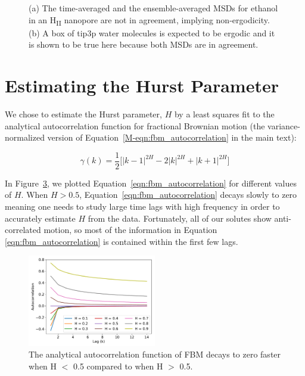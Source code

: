 \documentclass{article}
\begin{document}
\begin{figure}[!htb]
\begin{subfigure}{0.45\textwidth}
  \caption{}\label{fig:water_box_msd_comparison}
  \end{subfigure} 
  \caption{(a) The time-averaged and the ensemble-averaged MSDs for ethanol in
	  an H\textsubscript{II} nanopore are not in agreement, implying non-ergodicity.
	  (b) A box of tip3p water molecules is expected to be ergodic and it is shown to
	  be true here because both MSDs are in agreement. }\label{fig:msd_comparison}
  \end{figure}

  
  \newpage
  \section{Estimating the Hurst Parameter}\label{section:H_estimate}
  
  We chose to estimate the Hurst parameter, $H$ by a least squares fit to the analytical
  autocorrelation function for fractional Brownian motion (the variance-normalized version 
  of Equation~\ref{M-eqn:fbm_autocorrelation} in the main text):
  
  \begin{equation}
    \gamma(k) = \dfrac{1}{2}\bigg[|k-1|^{2H} - 2|k|^{2H} + |k+1|^{2H}\bigg]
  \label{eqn:fbm_autocorrelation}
  \end{equation}  
  
  In Figure~\ref{fig:hurst_autocorrelation}, we plotted Equation~\ref{eqn:fbm_autocorrelation}
  for different values of $H$. When $H > 0.5$, Equation~\ref{eqn:fbm_autocorrelation} decays
  slowly to zero meaning one needs to study large time lags with high frequency in order to
  accurately estimate $H$ from the data. Fortunately, all of our solutes show anti-correlated
  motion, so most of the information in Equation \ref{eqn:fbm_autocorrelation} is contained
  within the first few lags. 

  \begin{figure}
  \centering
  \includegraphics[width=0.5\textwidth]{hurst_autocorrelation.pdf}
  \caption{The analytical autocorrelation function of FBM decays to zero faster when 
  H $<$ 0.5 compared to when H $>$ 0.5.}\label{fig:hurst_autocorrelation}
  \end{figure}
  
\end{document}
